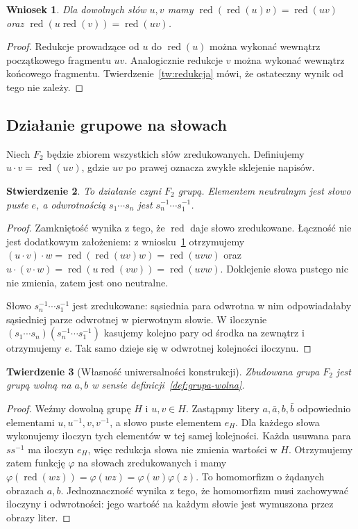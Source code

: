 \documentclass[11pt,a4paper]{article}
\numberwithin{equation}{section}
\theoremstyle{plain}
\newtheorem{twierdzenie}{Twierdzenie}[section]
\newtheorem{stwierdzenie}[twierdzenie]{Stwierdzenie}
\newtheorem{wniosek}[twierdzenie]{Wniosek}
\theoremstyle{definition}
\theoremstyle{remark}
\newcommand{\red}{\operatorname{red}}
\begin{document}
\begin{wniosek}\label{wn:redukcja-iloczyn}
Dla dowolnych słów $u,v$ mamy $\red(\red(u)v)=\red(uv)$ oraz $\red(u\red(v))=\red(uv)$.
\end{wniosek}
\begin{proof}
Redukcje prowadzące od $u$ do $\red(u)$ można wykonać wewnątrz początkowego fragmentu $uv$. Analogicznie redukcje $v$ można wykonać wewnątrz końcowego fragmentu. Twierdzenie~\ref{tw:redukcja} mówi, że ostateczny wynik od tego nie zależy.
\end{proof}

\subsection{Działanie grupowe na słowach}
Niech $F_2$ będzie zbiorem wszystkich słów zredukowanych. Definiujemy $u\cdot v=\red(uv)$, gdzie $uv$ po prawej oznacza zwykłe sklejenie napisów.
\begin{stwierdzenie}\label{st:grupa-slow}
To działanie czyni $F_2$ grupą. Elementem neutralnym jest słowo puste $e$, a odwrotnością $s_1\cdots s_n$ jest $s_n^{-1}\cdots s_1^{-1}$.
\end{stwierdzenie}
\begin{proof}
Zamkniętość wynika z tego, że $\red$ daje słowo zredukowane. Łączność nie jest dodatkowym założeniem: z wniosku~\ref{wn:redukcja-iloczyn} otrzymujemy $(u\cdot v)\cdot w=\red(\red(uv)w)=\red(uvw)$ oraz $u\cdot(v\cdot w)=\red(u\red(vw))=\red(uvw)$. Doklejenie słowa pustego nic nie zmienia, zatem jest ono neutralne.

Słowo $s_n^{-1}\cdots s_1^{-1}$ jest zredukowane: sąsiednia para odwrotna w nim odpowiadałaby sąsiedniej parze odwrotnej w pierwotnym słowie. W iloczynie $(s_1\cdots s_n)(s_n^{-1}\cdots s_1^{-1})$ kasujemy kolejno pary od środka na zewnątrz i otrzymujemy $e$. Tak samo dzieje się w odwrotnej kolejności iloczynu.
\end{proof}
\begin{twierdzenie}[Własność uniwersalności konstrukcji]\label{tw:uniwersalnosc}
Zbudowana grupa $F_2$ jest grupą wolną na $a,b$ w sensie definicji~\ref{def:grupa-wolna}.
\end{twierdzenie}
\begin{proof}
Weźmy dowolną grupę $H$ i $u,v\in H$. Zastąpmy litery $a,\bar a,b,\bar b$ odpowiednio elementami $u,u^{-1},v,v^{-1}$, a słowo puste elementem $e_H$. Dla każdego słowa wykonujemy iloczyn tych elementów w tej samej kolejności. Każda usuwana para $ss^{-1}$ ma iloczyn $e_H$, więc redukcja słowa nie zmienia wartości w $H$. Otrzymujemy zatem funkcję $\varphi$ na słowach zredukowanych i mamy $\varphi(\red(wz))=\varphi(wz)=\varphi(w)\varphi(z)$. To homomorfizm o żądanych obrazach $a,b$. Jednoznaczność wynika z tego, że homomorfizm musi zachowywać iloczyny i odwrotności: jego wartość na każdym słowie jest wymuszona przez obrazy liter.
\end{proof}
\end{document}
